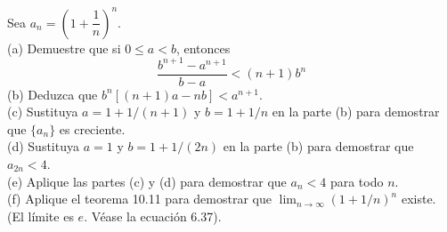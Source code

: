\item Sea $a_n = \left( 1 + \dfrac{1}{n} \right)^n$. \\
    (a) Demuestre que si $0 \le a < b$, entonces
    \[ \frac{b^{n+1} - a^{n+1}}{b - a} < (n + 1)b^n \]
    (b) Deduzca que $b^n[(n + 1)a - nb] < a^{n+1}$. \\
    (c) Sustituya $a = 1 + 1/(n + 1)$ y $b = 1 + 1/n$ en la parte (b) para demostrar que $\{a_n\}$ es creciente. \\
    (d) Sustituya $a = 1$ y $b = 1 + 1/(2n)$ en la parte (b) para demostrar que $a_{2n} < 4$. \\
    (e) Aplique las partes (c) y (d) para demostrar que $a_n < 4$ para todo $n$. \\
    (f) Aplique el teorema 10.11 para demostrar que $\lim_{n \to \infty} (1 + 1/n)^n$ existe. (El límite es $e$. Véase la ecuación 6.37).
